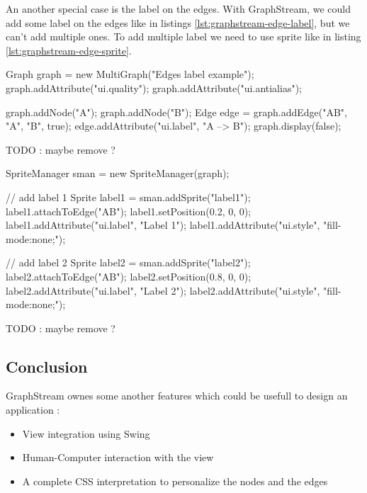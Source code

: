 An another special case is the label on the edges. With GraphStream, we could
add some label on the edges like in listings \ref{lst:graphstream-edge-label},
but we can't add multiple ones. To add multiple label we need to use sprite like
in listing \ref{lst:graphstream-edge-sprite}.

\begin{listing}[H]
  \centering
  \begin{javacode}
  Graph graph = new MultiGraph("Edges label example");
  graph.addAttribute("ui.quality");
  graph.addAttribute("ui.antialias");
  
  graph.addNode("A");
  graph.addNode("B");
  Edge edge = graph.addEdge("AB", "A", "B", true);
  edge.addAttribute("ui.label", "A --> B");
  graph.display(false);
  \end{javacode}
  \caption[Add a label on an edge with GraphStream]{TODO : maybe remove ?}
  \label{lst:graphstream-edge-label}
\end{listing}

\begin{listing}[H]
  \centering
  \begin{javacode}
    SpriteManager sman = new SpriteManager(graph);

    // add label 1
    Sprite label1 = sman.addSprite("label1");
    label1.attachToEdge("AB");
    label1.setPosition(0.2, 0, 0);
    label1.addAttribute("ui.label", "Label 1");
    label1.addAttribute("ui.style", "fill-mode:none;");

    // add label 2
    Sprite label2 = sman.addSprite("label2");
    label2.attachToEdge("AB");
    label2.setPosition(0.8, 0, 0);
    label2.addAttribute("ui.label", "Label 2");
    label2.addAttribute("ui.style", "fill-mode:none;");
  \end{javacode}
  \caption[Add two label on an edge with GraphStream]{TODO : maybe remove ?}
  \label{lst:graphstream-edge-sprite}
\end{listing}


\subsection{Conclusion}
\label{sub:Conclusion-gs}

GraphStream ownes some another features which could be usefull to design an application :
\begin{itemize}
\item View integration using Swing
\item Human-Computer interaction with the view
\item A complete CSS interpretation to personalize the nodes and the edges
\end{itemize}

